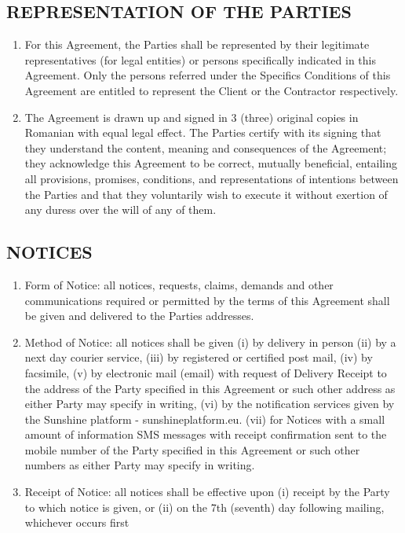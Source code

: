 \begin{multicols}{2}
\subsection{REPRESENTATION OF THE PARTIES}
\begin{enumerate}
	\item	For this Agreement, the Parties shall be represented by their legitimate representatives (for legal entities) or persons specifically indicated in this Agreement. Only the persons referred under the Specifics Conditions of this Agreement are entitled to represent the Client or the Contractor respectively.
	\item	The Agreement is drawn up and signed in 3 (three) original copies in Romanian with equal legal effect. The Parties certify with its signing that they understand the content, meaning and consequences of the Agreement; they acknowledge this Agreement to be correct, mutually beneficial, entailing all provisions, promises, conditions, and representations of intentions between the Parties and that they voluntarily wish to execute it without exertion of any duress over the will of any of them.
\end{enumerate}

\subsection{NOTICES}
\begin{enumerate}
	\item	Form of Notice: all notices, requests, claims, demands and other communications required or permitted by the terms of this Agreement shall be given and delivered to the Parties addresses.
	\item	Method of Notice: all notices shall be given (i) by delivery in person (ii) by a next day courier service, (iii) by registered or certified post mail, (iv) by facsimile, (v) by electronic mail (email) with request of Delivery Receipt to the address of the Party specified in this Agreement or such other address as either Party may specify in writing, (vi) by the notification services given by the Sunshine platform - sunshineplatform.eu. (vii) for Notices with a small amount of information SMS messages with receipt confirmation sent to the mobile number of the Party specified in this Agreement or such other numbers as either Party may specify in writing.
	\item	Receipt of Notice: all notices shall be effective upon (i) receipt by the Party to which notice is given, or (ii) on the 7th (seventh) day following mailing, whichever occurs first
\end{enumerate}

\end{multicols}

